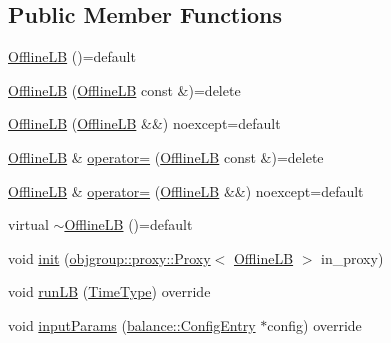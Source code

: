 \subsection*{Public Member Functions}
\begin{DoxyCompactItemize}
\item 
\hyperlink{structvt_1_1vrt_1_1collection_1_1lb_1_1_offline_l_b_a99528b3cbbb7cf3a3ffe298dd7f8b98a}{Offline\+LB} ()=default
\item 
\hyperlink{structvt_1_1vrt_1_1collection_1_1lb_1_1_offline_l_b_afb45e5b5adb6761c53877de9c4e7e4b1}{Offline\+LB} (\hyperlink{structvt_1_1vrt_1_1collection_1_1lb_1_1_offline_l_b}{Offline\+LB} const \&)=delete
\item 
\hyperlink{structvt_1_1vrt_1_1collection_1_1lb_1_1_offline_l_b_a26accbf7d8c123dc9594e64ec7eb8161}{Offline\+LB} (\hyperlink{structvt_1_1vrt_1_1collection_1_1lb_1_1_offline_l_b}{Offline\+LB} \&\&) noexcept=default
\item 
\hyperlink{structvt_1_1vrt_1_1collection_1_1lb_1_1_offline_l_b}{Offline\+LB} \& \hyperlink{structvt_1_1vrt_1_1collection_1_1lb_1_1_offline_l_b_a94affec36f4542b31b67748b17f577bb}{operator=} (\hyperlink{structvt_1_1vrt_1_1collection_1_1lb_1_1_offline_l_b}{Offline\+LB} const \&)=delete
\item 
\hyperlink{structvt_1_1vrt_1_1collection_1_1lb_1_1_offline_l_b}{Offline\+LB} \& \hyperlink{structvt_1_1vrt_1_1collection_1_1lb_1_1_offline_l_b_a2d6408b68d2f1eb5b59d78715e0915d5}{operator=} (\hyperlink{structvt_1_1vrt_1_1collection_1_1lb_1_1_offline_l_b}{Offline\+LB} \&\&) noexcept=default
\item 
virtual \hyperlink{structvt_1_1vrt_1_1collection_1_1lb_1_1_offline_l_b_a72e0da5f0731ce6290d8bbcc505e4d7a}{$\sim$\+Offline\+LB} ()=default
\item 
void \hyperlink{structvt_1_1vrt_1_1collection_1_1lb_1_1_offline_l_b_a872df3cf9b5018b990ef9029f7bf9110}{init} (\hyperlink{structvt_1_1objgroup_1_1proxy_1_1_proxy}{objgroup\+::proxy\+::\+Proxy}$<$ \hyperlink{structvt_1_1vrt_1_1collection_1_1lb_1_1_offline_l_b}{Offline\+LB} $>$ in\+\_\+proxy)
\item 
void \hyperlink{structvt_1_1vrt_1_1collection_1_1lb_1_1_offline_l_b_a8621ca0e36932e4271f62d9d8078bf3e}{run\+LB} (\hyperlink{namespacevt_a876a9d0cd5a952859c72de8a46881442}{Time\+Type}) override
\item 
void \hyperlink{structvt_1_1vrt_1_1collection_1_1lb_1_1_offline_l_b_a00fdf3796bc26affb03f45f5570560b6}{input\+Params} (\hyperlink{structvt_1_1vrt_1_1collection_1_1balance_1_1_config_entry}{balance\+::\+Config\+Entry} $\ast$config) override
\end{DoxyCompactItemize}
